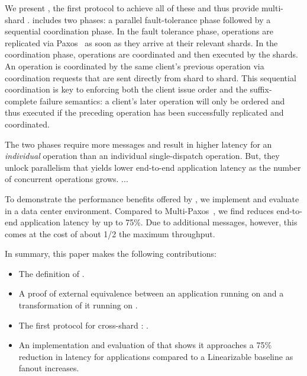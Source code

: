 We present \sys{}, the first protocol to achieve all of these and thus
provide multi-shard \mdl{}.
\sys{} includes two phases: a parallel fault-tolerance phase followed by a sequential coordination phase.
In the fault tolerance phase, operations are replicated via Paxos~\cite{lamport1998paxos} as soon as they arrive at their relevant shards.
In the coordination phase, operations are coordinated and then executed by the shards. An operation is coordinated by the same client's previous operation via coordination requests that are sent directly from shard to shard.
This sequential coordination is key to enforcing both the client issue order and the suffix-complete failure semantics:
a client's later operation will only be ordered and thus executed if the preceding operation has been successfully replicated and coordinated.

The two phases require more messages and result in higher latency for an \textit{individual} operation than an individual single-dispatch operation.
But, they unlock parallelism that yields lower end-to-end application latency as the number of concurrent operations grows.
...

%



To demonstrate the performance benefits offered by \MDL{},
we implement and evaluate \sys{} in a data center environment.
Compared to Multi-Paxos~\cite{lamport1998paxos}, we find \sys{}
reduces end-to-end application latency by up to 75\%. Due to
additional messages, however, this comes at the cost of about 1/2 the
maximum throughput.

In summary, this paper makes the following contributions:
\begin{itemize}[leftmargin=*]
\item The definition of \mdllong{}.
\item A proof of external equivalence between an application running on \sdl{} and a transformation of it running on \mdl{}.
\item The first protocol for cross-shard \mdl{}: \sys{}.
\item An implementation and evaluation of \sys{} that shows it approaches a 75\% reduction in latency for applications compared to a Linearizable baseline as fanout increases.
\end{itemize}
